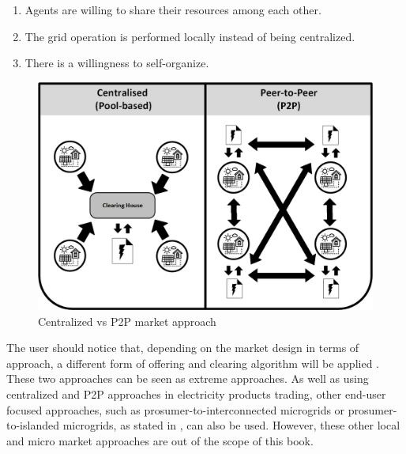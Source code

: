 \begin{enumerate}
\item Agents are willing to share their resources among each other.
\item The grid operation is performed locally instead of being centralized.
\item There is a willingness to self-organize.
\end{enumerate}

\begin{figure}[]
	\centering
	\includegraphics[width=0.4\columnwidth ]{ChapterIntro/Figures/CENTRALISED_P2P.jpg}
		\caption{Centralized vs P2P market approach}
	\label{fig:POOL_P2P}  
\end{figure}


The user should notice that, depending on the market design in terms of approach, a different form of offering and clearing algorithm will be applied \cite{Pinson2017}. These two approaches can be seen as extreme approaches. As well as using centralized and P2P approaches in electricity products trading, other end-user focused approaches, such as prosumer-to-interconnected microgrids or prosumer-to-islanded microgrids, as stated in \cite{parag2016electricity}, can also be used. However, these other local and micro market approaches are out of the scope of this book.


